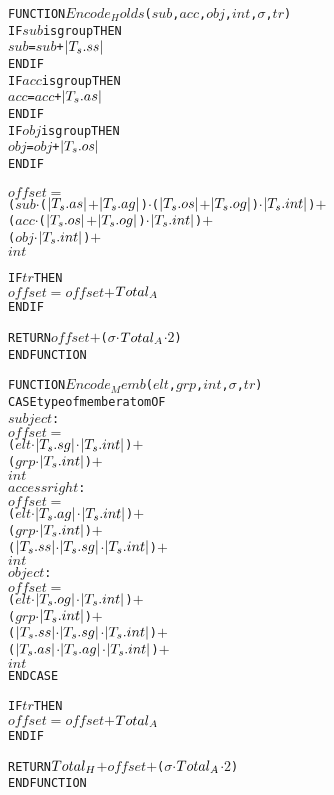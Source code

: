 \documentclass[11pt]{report}
\newenvironment{vverbatim}
{
  \begin{alltt}
}
{
  \vspace{-\baselineskip}
  \end{alltt}
}
\begin{document}
        \begin{vverbatim}
  FUNCTION \(Encode_Holds\)(\(sub\), \(acc\), \(obj\), \(int\), \(\sigma\), \(tr\))
    IF \(sub\) is group THEN
      \(sub\) = \(sub\) + \(|T\sb{s}.ss|\)
    ENDIF
    IF \(acc\) is group THEN
      \(acc\) = \(acc\) + \(|T\sb{s}.as|\)
    ENDIF
    IF \(obj\) is group THEN
      \(obj\) = \(obj\) + \(|T\sb{s}.os|\)
    ENDIF

    \(offset\) \(=\)
      (\(sub\) \(\cdot\) (\(|T\sb{s}.as|\) \(+\) \(|T\sb{s}.ag|\)) \(\cdot\) (\(|T\sb{s}.os|\) \(+\) \(|T\sb{s}.og|\)) \(\cdot\) \(|T\sb{s}.int|\)) \(+\)
      (\(acc\) \(\cdot\) (\(|T\sb{s}.os|\) \(+\) \(|T\sb{s}.og|\)) \(\cdot\) \(|T\sb{s}.int|\)) \(+\)
      (\(obj\) \(\cdot\) \(|T\sb{s}.int|\)) \(+\)
      \(int\)
      
    IF \(tr\) THEN
      \(offset\) \(=\) \(offset\) \(+\) \(Total\sb{A}\)
    ENDIF

    RETURN \(offset\) \(+\) (\(\sigma\) \(\cdot\) \(Total\sb{A}\) \(\cdot\) \(2\))
  ENDFUNCTION
        \end{vverbatim}

        \begin{vverbatim}
  FUNCTION \(Encode_Memb\)(\(elt\), \(grp\), \(int\), \(\sigma\), \(tr\))
    CASE type of member atom OF
      \(subject\) :
        \(offset\) \(=\)
          (\(elt\) \(\cdot\) \(|T\sb{s}.sg|\) \(\cdot\) \(|T\sb{s}.int|\)) \(+\)
          (\(grp\) \(\cdot\) \(|T\sb{s}.int|\)) \(+\)
          \(int\)
      \(access right\) :
        \(offset\) \(=\)
          (\(elt\) \(\cdot\) \(|T\sb{s}.ag|\) \(\cdot\) \(|T\sb{s}.int|\)) \(+\)
          (\(grp\) \(\cdot\) \(|T\sb{s}.int|\)) \(+\)
          (\(|T\sb{s}.ss|\) \(\cdot\) \(|T\sb{s}.sg|\) \(\cdot\) \(|T\sb{s}.int|\)) \(+\)
          \(int\)
      \(object\) :
        \(offset\) \(=\)
          (\(elt\) \(\cdot\) \(|T\sb{s}.og|\) \(\cdot\) \(|T\sb{s}.int|\)) \(+\)
          (\(grp\) \(\cdot\) \(|T\sb{s}.int|\)) \(+\)
          (\(|T\sb{s}.ss|\) \(\cdot\) \(|T\sb{s}.sg|\) \(\cdot\) \(|T\sb{s}.int|\)) \(+\)
          (\(|T\sb{s}.as|\) \(\cdot\) \(|T\sb{s}.ag|\) \(\cdot\) \(|T\sb{s}.int|\)) \(+\)
          \(int\)
    ENDCASE
      
    IF \(tr\) THEN
      \(offset\) \(=\) \(offset\) \(+\) \(Total\sb{A}\)
    ENDIF

    RETURN \(Total\sb{H}\) \(+\) \(offset\) \(+\) (\(\sigma\) \(\cdot\) \(Total\sb{A}\) \(\cdot\) \(2\))
  ENDFUNCTION
        \end{vverbatim}
\end{document}
